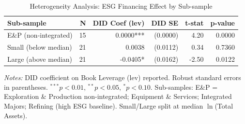 \begin{table}[htbp]
  \centering
  \caption{Heterogeneity Analysis: ESG Financing Effect by Sub-sample}
  \label{tab:heterogeneity}
  \begin{threeparttable}
  \begin{tabular}{lrrrrr}
    \toprule
    \textbf{Sub-sample} & \textbf{N} & \textbf{DID Coef (lev)} & \textbf{DID SE} & \textbf{t-stat} & \textbf{p-value} \\
    \midrule
    E\&P (non-integrated) & 15 & 0.0000*** & (0.0000) & 4.20 & 0.0000 \\
    Small (below median) & 21 & 0.0038 & (0.0112) & 0.34 & 0.7360 \\
    Large (above median) & 21 & -0.0405* & (0.0162) & -2.50 & 0.0122 \\
    \bottomrule
  \end{tabular}
  \begin{tablenotes}
    \small
    \item \textit{Notes:} DID coefficient on Book Leverage (lev) reported.
    Robust standard errors in parentheses. $^{***} p<0.01$, $^{**} p<0.05$, $^{*} p<0.10$.
    Sub-samples: E\&P = Exploration \& Production non-integrated; Equipment \& Services;
    Integrated Majors; Refining (high ESG baseline).
    Small/Large split at median $\ln$(Total Assets).
  \end{tablenotes}
  \end{threeparttable}
\end{table}
